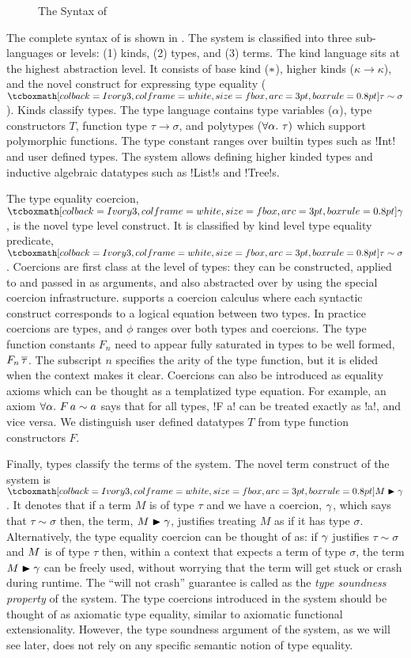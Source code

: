 \documentclass[screen,nonacm,manuscript,review]{acmart} %
\begin{document}
\begin{figure}[ht]
 \caption{The Syntax of \SFC}
 \label{fig:sfc-syntax}
\end{figure}

The complete syntax of \SFC is shown in . The
system is classified into three sub-languages or levels: (1) kinds,
(2) types, and (3) terms. The kind language sits at the highest
abstraction level. It consists of base kind ($\ast$), higher kinds
($\kappa \to \kappa$), and the novel construct for expressing type
equality ($\shl{\tau \sim \sigma}$).
Kinds classify types. The type language contains
type variables ($\alpha$), type constructors $T$,
function type $\tau\to\sigma$,
and polytypes ($\forall\alpha.~\tau)$ which support polymorphic functions.
The type constant ranges over builtin types such as !Int!
and user defined types.
The system allows defining higher kinded types and
inductive algebraic datatypes such as !List!s and !Tree!s.

The type equality coercion, $\shl{\Co}$, is the novel type level construct.
It is classified by kind level type equality predicate,
$\shl{\tau\sim\sigma}$. Coercions are first class at the level of types:
they can be constructed, applied to and passed in as arguments, and also
abstracted over by using the special coercion infrastructure.
\SFC supports a coercion calculus where
each syntactic construct corresponds to a logical equation between two
types. In practice coercions are types, and $\phi$ ranges over both
types and coercions. The type function constants $F_n$ need to appear fully
saturated in types to be well formed, $F_n\,\overline{\tau}$.
The subscript $n$ specifies the arity of the type function,
but it is elided when the context makes it clear.
Coercions can also be introduced as equality axioms which can be
thought as a templatized type equation.
For example, an axiom $\forall\alpha.~F\, a \sim a$
says that for all types, !F a! can be treated exactly as !a!, and vice
versa. We distinguish user defined datatypes $T$
from type function constructors $F$.

Finally, types classify the terms of the system.
The novel term construct of the system is $\shl{\Cast \Tm \Co}$.
It denotes that if a term $M$ is of type $\tau$
and we have a coercion, $\gamma$, which says that $\tau\sim\sigma$
then, the term, $M\mathrel{\blacktriangleright}\gamma$, justifies treating $M$ as if it has type
$\sigma$. Alternatively, the type equality coercion can be thought of
as: if $\gamma$ justifies $\tau \sim \sigma$ and $M$ is of type $\tau$
then, within a context that expects a term of type $\sigma$,
the term $M\mathrel{\blacktriangleright}\gamma$ can be freely used,
without worrying that the term will get stuck or crash during runtime.
The ``will not crash'' guarantee is called as the \emph{type
  soundness property} of the system. The type coercions introduced
in the system should be thought of as axiomatic type equality,
similar to axiomatic functional extensionality.
However, the type soundness argument of the system, as we
will see later, does not rely on any specific
semantic notion of type equality.
\end{document}
